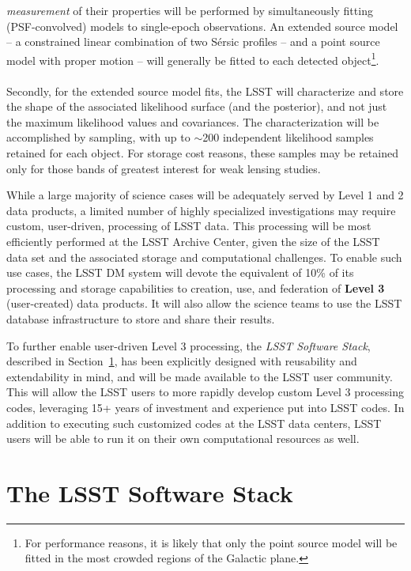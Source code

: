 \documentclass[11pt,twoside]{article}
\begin{document}
\begin{itemize}
{\em measurement} of their properties will be performed by
simultaneously fitting (PSF-convolved) models to single-epoch
observations. An extended source model -- a constrained linear
combination of two S\'ersic profiles -- and a point source model with
proper motion -- will generally be
fitted to each detected object\footnote{For performance reasons, it is
  likely that only the point source model will be fitted in the most
  crowded regions of the Galactic plane.}.\\
\\
Secondly, for the extended source model fits, the LSST will
characterize and store the shape of the associated likelihood surface
(and the posterior), and not just the maximum likelihood values and
covariances. The characterization will be accomplished by sampling,
with up to $\sim$200 independent likelihood samples retained for
each object. For storage cost reasons, these samples
may be retained only for those bands of greatest interest for
weak lensing studies.

\end{itemize}


While a large majority of science cases will be adequately served by
Level 1 and 2 data products, a limited number of highly specialized
investigations may require custom, user-driven, processing of LSST
data. This processing will be most efficiently performed at the
LSST Archive Center, given the size of the LSST data set and the
associated storage and computational challenges. To enable such use
cases, the LSST DM system will devote the equivalent of 10\% of its
processing and storage capabilities to creation, use, and federation
of {\bf Level 3} (user-created) data products. It will also allow the
science teams to use the LSST database infrastructure to store and
share their results.

To further enable user-driven Level 3 processing, the {\em LSST Software
Stack}, described in Section~\ref{sec:dmstack}, has been explicitly
designed with reusability and extendability in mind, and will be made
available to the LSST user community. This will allow the LSST users to
more rapidly develop custom Level 3 processing codes, leveraging 15+
years of investment and experience put into LSST codes. In addition to
executing such customized codes at the LSST data centers, LSST users
will be able to run it on their own computational resources as well.\\



\section{The LSST Software Stack}
\label{sec:dmstack}
\end{document}

